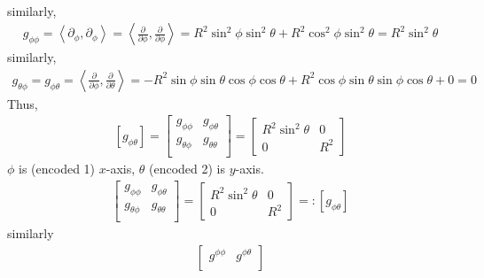 \documentclass{article}
\begin{document}
\begin{homeworkProblem}
\begin{align}
    \end{align}
    similarly,
    \begin{align}
        g_{\phi \phi} = \left\langle \partial_{\phi}, \partial_{\phi} \right\rangle
        = \left\langle \frac{ \partial }{ \partial \phi }, \frac{ \partial }{ \partial \phi } \right\rangle
        = R^2 \sin^2 \phi \sin^2 \theta + R^2 \cos^2 \phi \sin^2 \theta 
        = R^2 \sin^2 \theta
    \end{align}
    similarly,
    \begin{align}
        g_{\theta \phi} = g_{\phi \theta}
        = \left\langle \frac{ \partial }{ \partial \phi }, \frac{ \partial }{ \partial \theta } \right\rangle 
        = - R^2 \sin \phi \sin \theta \cos \phi \cos \theta
        + R^2 \cos \phi \sin \theta \sin \phi \cos \theta
        + 0
        = 0
    \end{align}
    Thus,
    \begin{align}
        \left[ g_{\phi \theta} \right] =
        \begin{bmatrix}
            g_{\phi \phi} & g_{\phi \theta} \\
            g_{\theta \phi} & g_{\theta \theta}\\
        \end{bmatrix}
        =
        \begin{bmatrix}
            R^2 \sin^2 \theta & 0 \\
            0 & R^2
        \end{bmatrix}
    \end{align}
    $\phi$ is (encoded 1) $x$-axis, $\theta$ (encoded 2) is $y$-axis.\\
    \begin{align}
        \begin{bmatrix}
        g_{\phi \phi} & g_{\phi \theta} \\
        g_{\theta \phi} & g_{\theta \theta} \\
        \end{bmatrix}
        =
        \begin{bmatrix}
            R^2 \sin^2 \theta & 0 \\
            0 & R^2
        \end{bmatrix}
        =: \left[ g_{\phi \theta} \right]
    \end{align}
    similarly
    \begin{align}
        \begin{bmatrix}
            g^{\phi \phi} & g^{\phi \theta}\\

\end{bmatrix}
\end{align}
\end{homeworkProblem}
\end{document}
